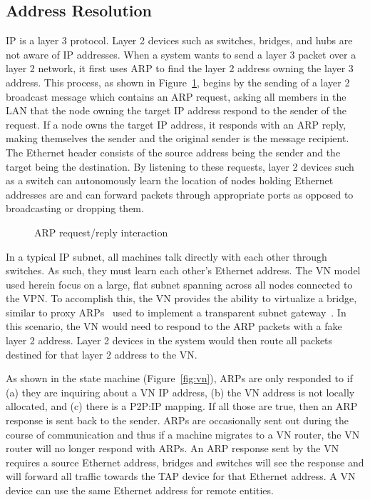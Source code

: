 \subsection{Address Resolution}
\label{vpns:arp}

IP is a layer 3 protocol. Layer 2 devices such as switches, bridges, and hubs
are not aware of IP addresses.  When a system wants to send a layer 3 packet
over a layer 2 network, it first uses ARP to find the layer 2 address owning
the layer 3 address.  This process, as shown in Figure~\ref{fig:arp}, begins by
the sending of a layer 2 broadcast message which contains an ARP request,
asking all members in the LAN that the node owning the target IP address
respond to the sender of the request.  If a node owns the target IP address, it
responds with an ARP reply, making themselves the sender and the original
sender is the message recipient.  The Ethernet header consists of the source
address being the sender and the target being the destination.  By listening to
these requests, layer 2 devices such as a switch can autonomously learn the
location of nodes holding Ethernet addresses are and can forward packets
through appropriate ports as opposed to broadcasting or dropping them.

\begin{figure}
\centering
{}
\caption{ARP request/reply interaction}
\label{fig:arp}
\end{figure}

In a typical IP subnet, all machines talk directly with each other through
switches.  As such, they must learn each other's Ethernet address. The VN model
used herein focus on a large, flat subnet spanning across all nodes connected
to the VPN.  To accomplish this, the VN provides the ability to virtualize a
bridge, similar to proxy ARPs~\cite{RFC0925} used to implement a transparent
subnet gateway~\cite{RFC1027}.  In this scenario, the VN would need to respond
to the ARP packets with a fake layer 2 address.  Layer 2 devices in the system
would then route all packets destined for that layer 2 address to the VN.

As shown in the state machine (Figure~\ref{fig:vn}), ARPs are only responded to
if (a) they are inquiring about a VN IP address, (b) the VN address is not
locally allocated, and (c) there is a P2P:IP mapping.  If all those are true,
then an ARP response is sent back to the sender.  ARPs are occasionally sent
out during the course of communication and thus if a machine migrates to a VN
router, the VN router will no longer respond with ARPs.  An ARP response sent
by the VN requires a source Ethernet address, bridges and switches will see the
response and will forward all traffic towards the TAP device for that Ethernet
address.  A VN device can use the same Ethernet address for remote entities.


